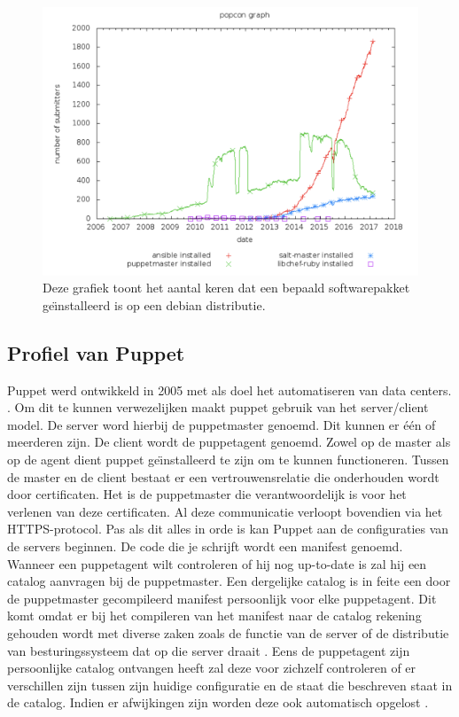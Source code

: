 \begin{figure}
  \includegraphics[width=\linewidth]{img/popcon_everybody.png}
  \caption{Deze grafiek toont het aantal keren dat een bepaald softwarepakket ge\"{\i}nstalleerd is op een debian distributie. \autocite{popcon}}
  \label{fig:popcon_everybody}
\end{figure}

\subsection{Profiel van Puppet}

Puppet werd ontwikkeld in 2005 met als doel het automatiseren van data centers. \autocite{puppetfaq}. Om dit te kunnen verwezelijken maakt puppet gebruik van  het server/client model. De server word hierbij de puppetmaster genoemd. Dit kunnen er   \'e\'en of meerderen zijn. De client wordt de puppetagent genoemd. Zowel op de master als op de agent dient puppet ge{\"\i}nstalleerd te zijn om te kunnen functioneren. Tussen de master en de client bestaat er een vertrouwensrelatie die onderhouden wordt door certificaten. Het is de puppetmaster die verantwoordelijk is voor het verlenen van deze certificaten. Al deze communicatie verloopt bovendien via het HTTPS-protocol. Pas als dit alles in orde is kan Puppet  aan de configuraties van de servers beginnen. De code die je schrijft wordt een manifest genoemd. Wanneer een puppetagent wilt controleren of hij nog up-to-date is zal hij een catalog aanvragen bij de puppetmaster. Een dergelijke catalog is in feite een door de puppetmaster gecompileerd manifest persoonlijk voor elke puppetagent. Dit komt omdat er bij het compileren van het manifest naar de catalog rekening gehouden wordt met diverse zaken zoals de functie van de server of de distributie van besturingssysteem dat op die server draait \autocite{puppetlanguagecatalog}. Eens de puppetagent zijn persoonlijke catalog ontvangen heeft zal deze voor zichzelf controleren of er verschillen zijn tussen zijn huidige configuratie en de staat die beschreven staat in de catalog. Indien er afwijkingen zijn worden deze ook automatisch opgelost \autocite{puppetdoc}.


